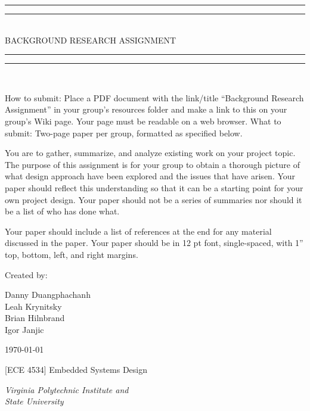 
\begin{titlepage}

\centering
\vspace*{\baselineskip}

\rule{\textwidth}{1.6pt}\vspace*{-\baselineskip}\vspace*{2pt}
\rule{\textwidth}{0.4pt}\\[\baselineskip]

{\LARGE BACKGROUND RESEARCH ASSIGNMENT}\\[0.2\baselineskip]

\rule{\textwidth}{0.4pt}\vspace*{-\baselineskip}\vspace{3.2pt}
\rule{\textwidth}{1.6pt}\\[\baselineskip]

\wl

\scshape
{\small How to submit: Place a PDF document with the link/title ``Background Research
Assignment'' in your group's resources folder and make a link to this on your
group's Wiki page. Your page must be readable on a web browser. What to submit:
Two-page paper per group, formatted as specified below.

You are to gather, summarize, and analyze existing work on your project topic.
The purpose of this assignment is for your group to obtain a thorough picture of
what design approach have been explored and the issues that have arisen. Your
paper should reflect this understanding so that it can be a starting point for
your own project design. Your paper should not be a series of summaries nor
should it be a list of who has done what.

Your paper should include a list of references at the end for any material
discussed in the paper. Your paper should be in 12 pt font, single-spaced,
with 1'' top, bottom, left, and right margins.
\\[\baselineskip]\par}

\vfill

Created by:\\[0.3\baselineskip]
{Danny Duangphachanh\\ Leah Krynitsky\\ Brian Hilnbrand\\ Igor Janjic\par}
{\small \today\\\par}
{\small [ECE 4534] Embedded Systems Design\\\par}
{\small\itshape Virginia Polytechnic Institute and\\ State University\par}


\end{titlepage}
